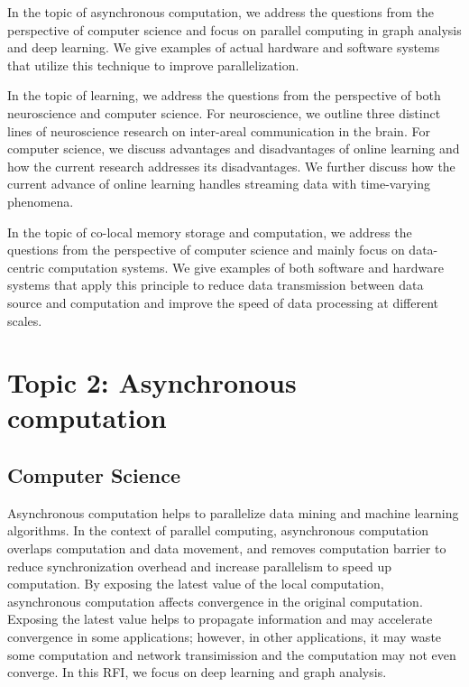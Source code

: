 \documentclass[12pt]{report}
\begin{document}
In the topic of asynchronous computation, we address the questions from
the perspective of computer science and focus on parallel computing in graph
analysis and deep learning. We give examples of actual hardware and software
systems that utilize this technique to improve parallelization.

In the topic of learning, we address the questions from the perspective of
both neuroscience and computer science. For neuroscience, we outline three
distinct lines of neuroscience research on inter-areal communication in the brain.
For computer science, we discuss advantages and disadvantages of online learning
and how the current research addresses its disadvantages. We further discuss
how the current advance of online learning handles streaming data with
time-varying phenomena.

In the topic of co-local memory storage and computation, we address
the questions from the perspective of computer science and mainly focus on
data-centric computation systems. We give examples of both software and
hardware systems that apply this principle to reduce data transmission between
data source and computation and improve the speed of data processing at
different scales.

\newpage

\section*{Topic 2: Asynchronous computation}

\subsection*{Computer Science}

Asynchronous computation helps to parallelize data mining and machine learning
algorithms. In the context of parallel computing, asynchronous computation
overlaps computation and data movement, and removes computation barrier to
reduce synchronization
overhead and increase parallelism to speed up computation. By exposing
the latest value of the local computation, asynchronous computation affects
convergence in the original computation. Exposing the latest value helps to
propagate information and may accelerate convergence in some applications;
however, in other applications, it may waste some computation and network
transimission and the computation may not even converge. In this RFI, we
focus on deep learning and graph analysis.
\end{document}
